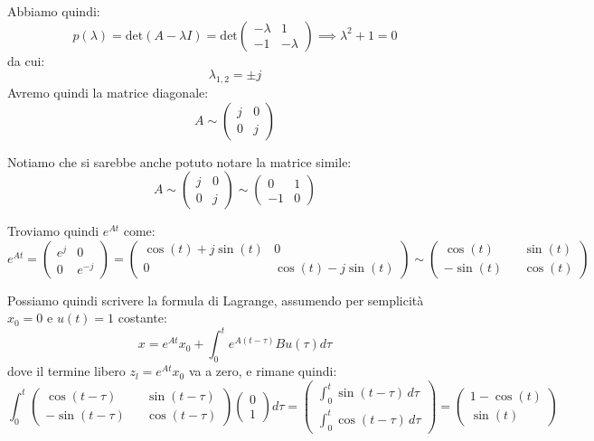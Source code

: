 \documentclass[a4paper,11pt]{article}
\begin{document}
Abbiamo quindi:
$$
p(\lambda) = \mathrm{det}(A - \lambda I) = \mathrm{det} \begin{pmatrix}
	-\lambda & 1 \\ 
	-1 & -\lambda
\end{pmatrix}
\implies 
\lambda^2 + 1 = 0
$$
da cui:
$$
\lambda_{1, 2} = \pm j
$$
Avremo quindi la matrice diagonale:
$$
A \sim \begin{pmatrix}
	j & 0 \\ 
	0 & j
\end{pmatrix} 
$$

Notiamo che si sarebbe anche potuto notare la matrice simile:
$$
A \sim \begin{pmatrix}
	j & 0 \\ 
	0 & j
\end{pmatrix} 
\sim 
\begin{pmatrix}
	0 & 1 \\ 
	-1 & 0
\end{pmatrix}
$$

Troviamo quindi $e^{At}$ come:
$$
e^{At} = \begin{pmatrix}
	e^j & 0 \\ 
	0 & e^{-j}
\end{pmatrix} = \begin{pmatrix}
	\cos(t) + j \sin(t) & 0 \\ 
	0 & \cos(t) - j \sin(t)
\end{pmatrix} \sim \begin{pmatrix}
	\cos(t) && \sin(t) \\ 
	-\sin(t) && \cos(t)
\end{pmatrix}
$$

Possiamo quindi scrivere la formula di Lagrange, assumendo per semplicità $x_0 = 0$ e $u(t) = 1$ costante:
$$
x = e^{At} x_0 + \int_0^t e^{A(t - \tau)} B u(\tau) d\tau
$$
dove il termine libero $z_l = e^{At} x_0$ va a zero, e rimane quindi:
$$
\int_0^t \begin{pmatrix}
	\cos(t - \tau) && \sin(t - \tau) \\ 
	-\sin(t - \tau) && \cos(t - \tau)
\end{pmatrix}
\begin{pmatrix}
	0 \\ 1
\end{pmatrix}
	d\tau
=
\begin{pmatrix}
\int_0^t \sin(t - \tau) \, d \tau \\
\int_0^t \cos(t - \tau) \, d \tau
\end{pmatrix}
= \begin{pmatrix}
1 - \cos(t) \\ 
\sin(t)
\end{pmatrix}
$$
\end{document}
